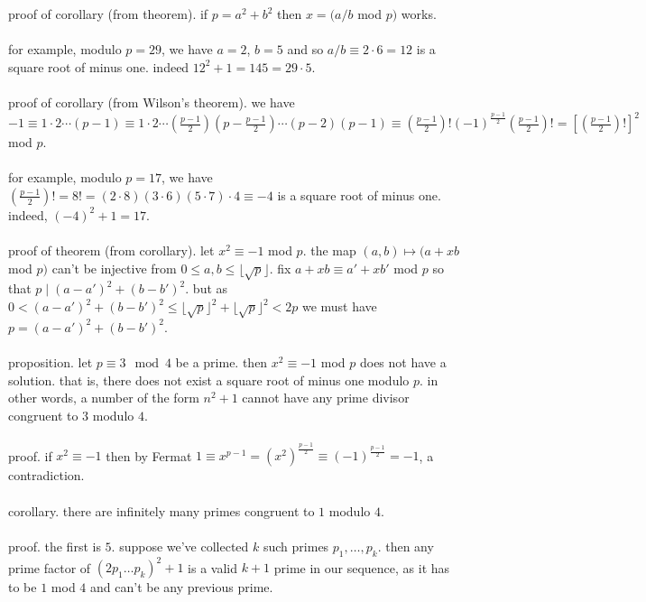 \documentclass{article}
\newcommand{\floor}[1]{\lfloor#1\rfloor}
\begin{document}
proof of corollary (from theorem). if $p=a^2+b^2$ then $x=(a/b$ mod $p)$ works. \\\\
for example, modulo $p=29$, we have $a=2$, $b=5$ and so $a/b\equiv 2\cdot 6=12$ is a square root of minus one. indeed $12^2+1=145=29\cdot 5$. \\\\
proof of corollary (from Wilson's theorem). we have $-1\equiv 1\cdot 2\cdots (p-1)\equiv 1\cdot 2\cdots(\frac{p-1}{2})(p-\frac{p-1}{2})\cdots(p-2)(p-1)\equiv (\frac{p-1}{2})! (-1)^{\frac{p-1}{2}}(\frac{p-1}{2})!=[(\frac{p-1}{2})!]^2$ mod $p$. \\\\
for example, modulo $p=17$, we have $(\frac{p-1}{2})!=8!=(2\cdot 8)( 3\cdot 6)( 5\cdot 7)\cdot 4\equiv -4$ is a square root of minus one. indeed, $(-4)^2+1=17$. \\\\
proof of theorem (from corollary). let $x^2\equiv-1$ mod $p$. the map $(a,b)\mapsto (a+xb $ mod $p)$ can't be injective from $0\le a,b\le \floor{\sqrt{p}}$. fix $a+xb\equiv a'+xb'$ mod $p$ so that $p\mid (a-a')^2+(b-b')^2$. but as $0<(a-a')^2+(b-b')^2\le \floor{\sqrt{p}}^2+\floor{\sqrt{p}}^2<2p$ we must have $p=(a-a')^2+(b-b')^2$. \\\\
proposition. let $p\equiv 3\mod 4$ be a prime. then $x^2\equiv -1$ mod $p$ does not have a solution. that is, there does not exist a square root of minus one modulo $p$. in other words, a number of the form $n^2+1$ cannot have any prime divisor congruent to $3$ modulo $4$. \\\\
proof. if $x^2\equiv -1$ then by Fermat $1\equiv x^{p-1}=(x^2)^{\frac{p-1}{2}}\equiv (-1)^{\frac{p-1}{2}}=-1$, a contradiction. \\\\
corollary. there are infinitely many primes congruent to $1$ modulo $4$. \\\\
proof. the first is $5$. suppose we've collected $k$ such primes $p_1,\dots,p_k$. then any prime factor of $(2p_1\dots p_k)^2+1$ is a valid $k+1$ prime in our sequence, as it has to be $1$ mod $4$ and can't be any previous prime. \\\\

\end{document}
